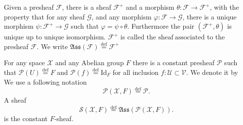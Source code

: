 \documentclass{beamer}
\theoremstyle{plain}
\newcommand{\be}{\begin{equation}}
\newcommand{\ee}{\end{equation}}
\newcommand{\Id}{\mathrm{Id}}
\newcommand{\sU}{\mathcal{U}}       %
\newcommand{\sV}{\mathcal{V}}       %
\newcommand{\sX}{\mathcal{X}}       %
\newcommand{\bydef}{\stackrel{\mathrm{def}}{=}}
\begin{document}
\begin{frame}
\begin{lemma}\label{sheaf_prdf}
	Given a presheaf $\mathscr F$, there is a sheaf  $\mathscr F^+$ and a morphism $\theta: \mathscr F \to \mathscr F^+$, with the property that for any sheaf  $\mathscr G$, and any morphism $\varphi: \mathscr F \to \mathscr G$, there is a unique morphism $\psi:\mathscr F^+\to \mathscr G$ such that $\varphi = \psi \circ \theta$. Furthermore the pair $\left(\mathscr F^+, \theta\right)$ is unique up to unique isomorphism. $\mathscr F^+$ is called the $\mathrm{sheaf~associated}$ to the presheaf $\mathscr F$. We write $\mathfrak{Ass}\left(\mathscr F \right)\bydef \mathscr F^+$ 
\end{lemma}
	\begin{definition}\label{constant_presheaf_defn}
	For any space $\sX$       and any Abelian group $F$ there is a \alert{constant presheaf} $\mathscr P$ such that $\mathscr P\left( U\right) \bydef F$ and $\mathscr P\left( f\right) \bydef \Id_F$ for all inclusion  $f: \sU \subset \sV$. We denote it by 
	We use a following notation
	\be\label{constant_presheaf_eqn}
\mathscr P\left(\sX, F \right)  \bydef \mathscr P.
	\ee
	A sheaf
	\be\label{constant_sheaf_eqn}
\mathscr S\left(\sX, F \right) \bydef \mathfrak{Ass}\left(\mathscr P\left(\sX, F \right) \right).
	\ee
is  the \alert{constant} $F$\alert{-sheaf}.
\end{definition}

\end{frame}
\end{document}
